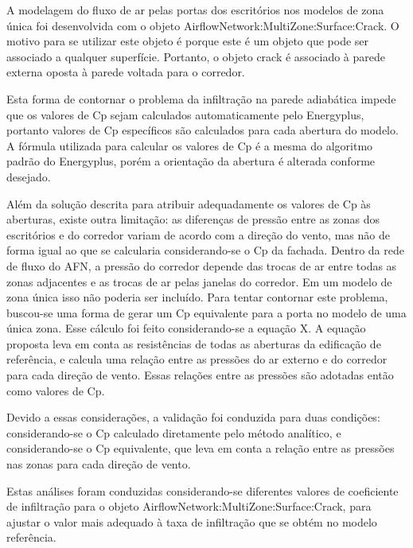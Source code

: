 \documentclass[brazil,hardcopy,openany,a5paper]{ufscthesis}
\begin{document}
		A modelagem do fluxo de ar pelas portas dos escritórios nos modelos de zona única foi desenvolvida com o objeto AirflowNetwork:MultiZone:Surface:Crack. O motivo para se utilizar este objeto é porque este é um objeto que pode ser associado a qualquer superfície. Portanto, o objeto crack é associado à parede externa oposta à parede voltada para o corredor.
		
		Esta forma de contornar o problema da infiltração na parede adiabática impede que os valores de Cp sejam calculados automaticamente pelo Energyplus, portanto valores de Cp específicos são calculados para cada abertura do modelo. A fórmula utilizada para calcular os valores de Cp é a mesma do algoritmo padrão do Energyplus, porém a orientação da abertura é alterada conforme desejado.
		
		Além da solução descrita para atribuir adequadamente os valores de Cp às aberturas, existe outra limitação: as diferenças de pressão entre as zonas dos escritórios e do corredor variam de acordo com a direção do vento, mas não de forma igual ao que se calcularia considerando-se o Cp da fachada. Dentro da rede de fluxo do AFN, a pressão do corredor depende das trocas de ar entre todas as zonas adjacentes e as trocas de ar pelas janelas do corredor. Em um modelo de zona única isso não poderia ser incluído. Para tentar contornar este problema, buscou-se uma forma de gerar um Cp equivalente para a porta no modelo de uma única zona. Esse cálculo foi feito considerando-se a equação X. A equação proposta leva em conta as resistências de todas as aberturas da edificação de referência, e calcula uma relação entre as pressões do ar externo e do corredor para cada direção de vento. Essas relações entre as pressões são adotadas então como valores de Cp.
		
		Devido a essas considerações, a validação foi conduzida para duas condições: considerando-se o Cp calculado diretamente pelo método analítico, e considerando-se o Cp equivalente, que leva em conta a relação entre as pressões nas zonas para cada direção de vento.
		
		Estas análises foram conduzidas considerando-se diferentes valores de coeficiente de infiltração para o objeto AirflowNetwork:MultiZone:Surface:Crack, para ajustar o valor mais adequado à taxa de infiltração que se obtém no modelo referência.
		
		
\end{document}
